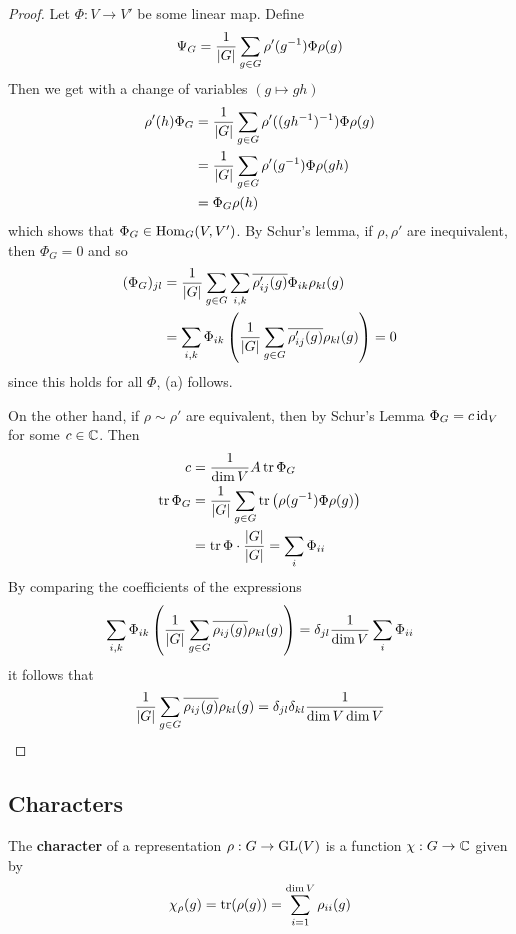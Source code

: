 \begin{proof}
Let $\Phi: V \to  V'$ be some linear map. Define
\begin{align*}
  \Psi_G = \frac{1}{\vert G\vert} \sum_{g \in G} \rho'(g^{-1})\Phi \rho(g)
\end{align*}
Then we get with a change of variables $(g \mapsto  gh)$
\begin{align*}
  \rho'(h)\Phi_G 
  &= 
  \frac{1}{\vert G\vert} \sum_{g \in G}\rho'((gh^{-1})^{-1}) \Phi \rho(g)\\
  &=
  \frac{1}{\vert G\vert} \sum_{g \in G}\rho'(g^{-1})\Phi \rho(gh)\\
  &=
  \Phi_G \rho(h)
\end{align*}
which shows that $\Phi_G \in \operatorname{Hom}_G(V,V')$. 
By Schur's lemma, if $\rho,\rho'$ are inequivalent, then $\Phi_G =0$ and so
\begin{align*}
  (\Phi_G)_{jl}
  &=
  \frac{1}{\vert G\vert} \sum_{g \in G} \sum_{i,k}
  \overline{\rho_{ij}'(g)} \Phi_{ik} \rho_{kl}(g)\\
  &=
  \sum_{i,k} \Phi_{ik} \left(
    \frac{1}{\vert G\vert} \sum_{g \in G} \overline{\rho_{ij}'(g)} \rho_{kl}(g)
  \right)
  = 0
\end{align*}
since this holds for all $\Phi$, (a) follows.

On the other hand, if $\rho \sim\rho'$ are equivalent, then by Schur's Lemma $\Phi_G = c \operatorname{id}_V$ for some $c \in \mathbb{C}$. Then
\begin{align*}
  c 
  &= 
  \frac{1}{\dim V} A \operatorname{tr} \Phi_G\\
  \operatorname{tr} \Phi_G
  &=
  \frac{1}{\vert G\vert}\sum_{g \in G}\operatorname{tr} \left(
    \rho(g^{-1})\Phi \rho(g)
  \right)
  \\
  &= \operatorname{tr} \Phi \cdot \frac{\vert G\vert}{\vert G\vert} = \sum_{i}\Phi_{ii}
\end{align*}
By comparing the coefficients of the expressions
\begin{align*}
  \sum_{i,k} \Phi_{ik} \left(
    \frac{1}{\vert G\vert} \sum_{g \in G}\overline{\rho_{ij}(g)}\rho_{kl}(g)
  \right)
  =
  \delta_{jl} \frac{1}{\dim V} \sum_{i} \Phi_{ii}
\end{align*}
it follows that
\begin{align*}
  \frac{1}{\vert G\vert} \sum_{g \in G}\overline{\rho_{ij}(g)} \rho_{kl}(g) = \delta_{jl}\delta_{kl} \frac{1}{\dim V\dim V}
\end{align*}
\end{proof}


\subsection{Characters}
\begin{dfn}[]
  The \textbf{character} of a representation $\rho: G \to \operatorname{GL}(V)$ is a function $\chi: G \to \mathbb{C}$ given by
  \begin{align*}
    \chi_{\rho}(g) = \operatorname{tr} (\rho(g)) = \sum_{i =1}^{\dim V}\rho_{ii}(g)
  \end{align*}
\end{dfn}


